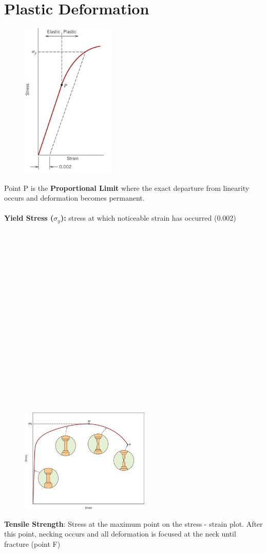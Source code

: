 \documentclass[12pt]{article}
\begin{document}
\section*{Plastic Deformation}
\begin{figure}
    \centering
    \includegraphics[width=0.4\textwidth]{yield.jpg}
\end{figure}
Point P is the \textbf{Proportional Limit} where the exact departure from linearity occurs and deformation becomes permanent.
\\\\
\textbf{Yield Stress ($\sigma_y$):} stress at which noticeable strain has occurred (0.002)
\\\\\\\\\\\\\\\\\\\\\\\\\\\\\\\\\\\\\\
\begin{figure}[H]
    \centering
    \includegraphics[width=0.55\textwidth]{tensile.jpg}
\end{figure}
\noindent\textbf{Tensile Strength}: Stress at the maximum point on the stress - strain plot. After this point, necking occurs and all deformation is focused at the neck until fracture (point F)
\end{document}
